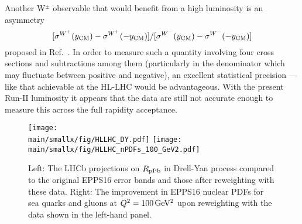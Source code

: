 \documentclass[../report.tex]{subfiles}
\providecommand{\main}{..}
\begin{document}

\noindent Another W$^\pm$ observable that would benefit from a high luminosity is an asymmetry $$[\sigma^{W^+}(y_{\rm CM})-\sigma^{W^+}(-y_{\rm CM})]/[\sigma^{W^-}(y_{\rm CM})-\sigma^{W^-}(-y_{\rm CM})]$$
proposed in Ref.~\cite{Paukkunen:2010qg}. In order to measure such a quantity involving four cross sections and subtractions among them (particularly in the denominator which may fluctuate between positive and negative), an excellent statistical precision --- like that achievable at the HL-LHC would be advantageous. With the present Run-II luminosity it appears that the data \cite{CMS:2018ilq} are still not accurate enough to measure this across the full rapidity acceptance.

%
\begin{figure}[htb!]
\centering
\texttt{[image: \\main/smallx/fig/HLLHC\_DY.pdf]}
\texttt{[image: \\main/smallx/fig/HLLHC\_nPDFs\_100\_GeV2.pdf]}
\caption{Left: The LHCb projections on $R_{\rm pPb}$ in  Drell-Yan process compared to the original EPPS16 error bands and those after reweighting with these data. Right: The improvement in EPPS16 nuclear PDFs for sea quarks and gluons at $Q^2=100\,{\rm GeV^2}$ upon reweighting with the data shown in the left-hand panel.}
\label{fig:DYRpPb}
\end{figure}
\end{document}
